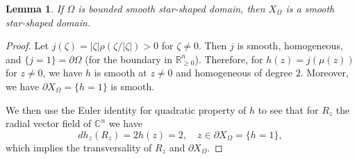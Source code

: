 \documentclass[11pt]{amsart}
\numberwithin{equation}{section}
\theoremstyle{plain}
\newtheorem{Lemma}[lemma]{Lemma}
\theoremstyle{definition}
\theoremstyle{remark}
\newcommand{\bC} { {\mathbb{C}}}
\newcommand{\bR} { {\mathbb{R}}}
\begin{document}
\begin{Lemma}If $\Omega$ is bounded smooth star-shaped domain, then $X_\Omega$ is a smooth star-shaped domain.     
\end{Lemma}
\begin{proof}Let $j(\zeta)=|\zeta|\rho(\zeta/|\zeta|)>0$ for $\zeta\neq 0$. Then $j$ is smooth, homogeneous, and $\{j=1\}=\partial \Omega$ (for the boundary in $\bR^n_{\geq0}$). Therefore, for $h(z)=j(\mu(z))$ for $z\neq 0$, we have $h$ is smooth at $z\neq 0$ and homogeneous of degree $2$. Moreover, we have $\partial X_\Omega=\{h=1\}$ is smooth.

We then use the Euler identity for quadratic property of $h$ to see that for $R_z$ the radial vector field of $\bC^n$ we have
\[dh_z(R_z)=2h(z)=2,\quad z\in \partial X_\Omega=\{h=1\},\]
which implies the transversality of $R_z$ and $\partial X_\Omega$.    
\end{proof}
\end{document}
